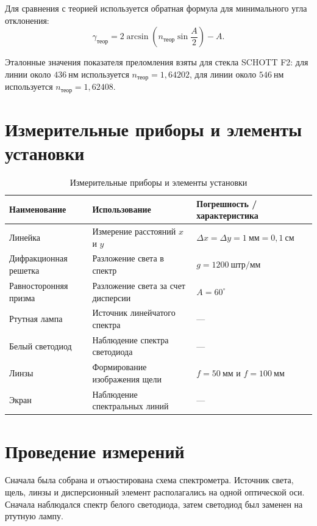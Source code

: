 \documentclass[a4paper,12pt]{article}
\begin{document}
Для сравнения с теорией используется обратная формула для минимального угла отклонения:
\begin{equation}
    \gamma_{\text{теор}} = 2\arcsin\left(n_{\text{теор}}\sin\frac{A}{2}\right)-A.
    \label{eq:gamma_theor}
\end{equation}

Эталонные значения показателя преломления взяты для стекла SCHOTT F2: для линии около $436~\text{нм}$ используется $n_{\text{теор}}=1{,}64202$, для линии около $546~\text{нм}$ используется $n_{\text{теор}}=1{,}62408$.

\section{Измерительные приборы и элементы установки}

\begin{table}[H]
\centering
\caption{Измерительные приборы и элементы установки}
\begin{tabular}{|>{\raggedright\arraybackslash}p{5cm}|>{\raggedright\arraybackslash}p{5cm}|>{\raggedright\arraybackslash}p{4cm}|}
\hline
Наименование & Использование & Погрешность / характеристика \\
\hline
Линейка & Измерение расстояний $x$ и $y$ & $\Delta x=\Delta y=1~\text{мм}=0{,}1~\text{см}$ \\
\hline
Дифракционная решетка & Разложение света в спектр & $g=1200~\text{штр/мм}$ \\
\hline
Равносторонняя призма & Разложение света за счет дисперсии & $A=60^\circ$ \\
\hline
Ртутная лампа & Источник линейчатого спектра & --- \\
\hline
Белый светодиод & Наблюдение спектра светодиода & --- \\
\hline
Линзы & Формирование изображения щели & $f=50~\text{мм}$ и $f=100~\text{мм}$ \\
\hline
Экран & Наблюдение спектральных линий & --- \\
\hline
\end{tabular}
\end{table}

\section{Проведение измерений}

Сначала была собрана и отъюстирована схема спектрометра. Источник света, щель, линзы и дисперсионный элемент располагались на одной оптической оси. Сначала наблюдался спектр белого светодиода, затем светодиод был заменен на ртутную лампу.
\end{document}
